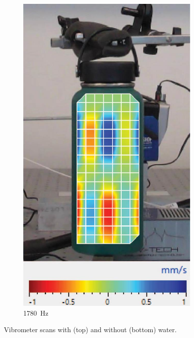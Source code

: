 \documentclass[twoside,a4paper]{article}
\begin{document}
\begin{figure}[!t]
\begin{subfigure}[b]{.32\columnwidth}
         \includegraphics[width=\columnwidth]{Paper/Figures/NoWater_1780.jpg}
         \caption{1780\ Hz}
    \end{subfigure}
    
    \label{fig:scans}
    \caption{Vibrometer scans with (top) and without (bottom) water.}
\end{figure}
\end{document}
